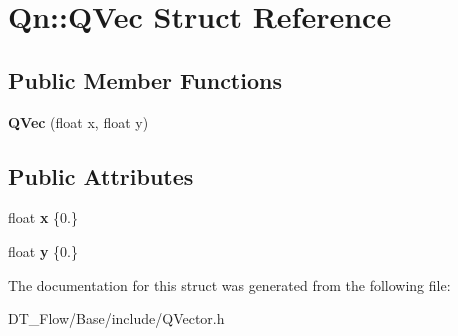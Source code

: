 \hypertarget{structQn_1_1QVec}{}\section{Qn\+:\+:Q\+Vec Struct Reference}
\label{structQn_1_1QVec}
\subsection*{Public Member Functions}
\begin{DoxyCompactItemize}
\item 
\mbox{\label{structQn_1_1QVec_ac949d3ad72ec39d5daf9c9902d9ac328}} 
{\bfseries Q\+Vec} (float x, float y)
\end{DoxyCompactItemize}
\subsection*{Public Attributes}
\begin{DoxyCompactItemize}
\item 
\mbox{\label{structQn_1_1QVec_a047920a04422322f0d61bb3da8b8dcf7}} 
float {\bfseries x} \{0.\}
\item 
\mbox{\label{structQn_1_1QVec_aec0b12ddbb4e2d252ab360f52a68875d}} 
float {\bfseries y} \{0.\}
\end{DoxyCompactItemize}


The documentation for this struct was generated from the following file\+:\begin{DoxyCompactItemize}
\item 
D\+T\+\_\+\+Flow/\+Base/include/Q\+Vector.\+h\end{DoxyCompactItemize}
